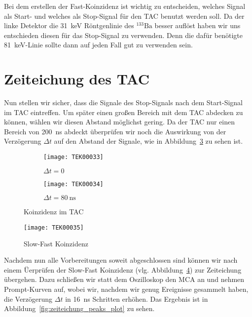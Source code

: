 \documentclass[11pt, ngerman, fleqn, DIV=15, headinclude, BCOR=2cm]{scrreprt}
\begin{document}
Bei dem erstellen der Fast-Koinzidenz ist wichtig zu entscheiden, welches
Signal als Start- und welches als Stop-Signal für den TAC benutzt werden soll.
Da der linke Detektor die \SI{31}{\kilo\electronvolt} Röntgenlinie des
$^{133}\text{Ba}$ besser auflöst haben wir uns entschieden diesen für das
Stop-Signal zu verwenden. Denn die dafür benötigte
\SI{81}{\kilo\electronvolt}-Linie sollte dann auf jeden Fall gut zu verwenden
sein.

\section{Zeiteichung des TAC}

Nun stellen wir sicher, dass die Signale des Stop-Signals nach dem Start-Signal
im TAC eintreffen. Um später einen großen Bereich mit dem TAC abdecken zu
können, wählen wir diesen Abstand möglichst gering. Da der TAC nur einen
Bereich von \SI{200}{\nano\second} abdeckt überprüfen wir noch die Auswirkung
von der Verzögerung $\Delta t$ auf den Abstand der Signale, wie in
Abbildung~\ref{fig:fast_signal_tac_koinzidenz} zu sehen ist.
\begin{figure}
	\centering
	\begin{subfigure}{0.49 \textwidth}
		\texttt{[image: TEK00033]}
		\caption{%
			$\Delta t = 0$
		}
		\label{fig:fast_signal_tac_koinzidenz-t0}
	\end{subfigure}
	\begin{subfigure}{0.49 \textwidth}
		\texttt{[image: TEK00034]}
		\caption{%
			$\Delta t = \SI{80}{\nano\second}$
		}
		\label{fig:fast_signal_tac_koinzidenz-t5-16}
	\end{subfigure}
	\caption{%
		Koinzidenz im TAC
	}
	\label{fig:fast_signal_tac_koinzidenz}
\end{figure}

\begin{figure}
	\centering
	\texttt{[image: TEK00035]}
	\caption{%
		Slow-Fast Koinzidenz
	}
	\label{fig:slow_fast_koinzidenz}
\end{figure}

Nachdem nun alle Vorbereitungen soweit abgeschlossen sind können wir nach einem
Üerprüfen der Slow-Fast Koinzidenz (vlg.
Abbildung~\ref{fig:slow_fast_koinzidenz})
zur Zeiteichung übergehen. Dazu schließen wir statt dem Oszilloskop den MCA an
und nehmen Prompt-Kurven auf, wobei wir, nachdem wir genug Ereignisse gesammelt
haben, die Verzögerung $\Delta t$ in \SI{16}{\nano\second} Schritten erhöhen.
Das Ergebnis ist in Abbildung~\ref{fig:zeiteichung_peaks_plot} zu sehen.
\end{document}

